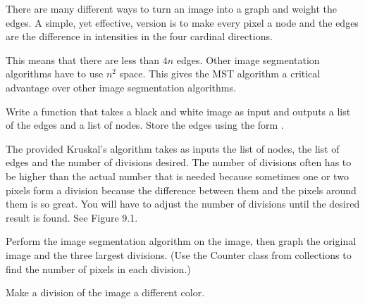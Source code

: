 There are many different ways to turn an image into a graph and weight the edges.
A simple, yet effective, version is to make every pixel a node and the edges are the difference in intensities in the four cardinal directions.


This means that there are less than $4n$ edges.
Other image segmentation algorithms have to use $n^2$ space.
This gives the MST algorithm a critical advantage over other image segmentation algorithms.

\begin{problem}
Write a function that takes a black and white image as input and outputs a list of the edges and a list of nodes.
Store the edges using the form .
\end{problem}

The provided Kruskal's algorithm takes as inputs the list of nodes, the list of edges and the number of divisions desired.
The number of divisions often has to be higher than the actual number that is needed because sometimes one or two pixels form a division because the difference between them and the pixels around them is so great.
You will have to adjust the number of divisions until the desired result is found.  See Figure 9.1.

\begin{problem}
Perform the image segmentation algorithm on the image, then graph the original image and the three largest divisions.
(Use the Counter class from collections to find the number of pixels in each division.)
\end{problem}

\begin{problem}
Make a division of the image a different color.
\end{problem}


